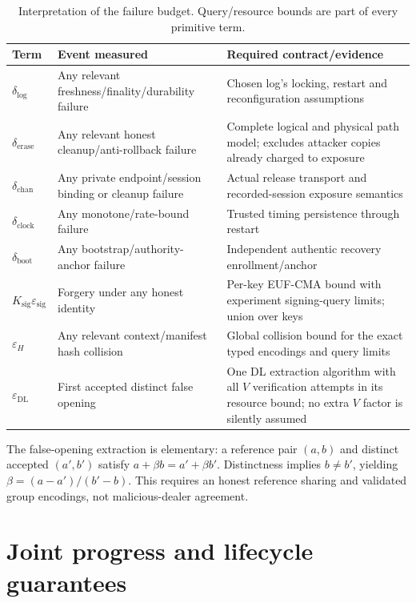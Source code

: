 \documentclass[pdflatex,sn-mathphys-num]{sn-jnl}
\theoremstyle{plain}
\theoremstyle{definition}
\begin{document}
\begin{table}[htbp]
\caption{Interpretation of the failure budget. Query/resource bounds are part of every primitive term.}\label{tab:budget}
\centering\footnotesize
\begin{tabularx}{\linewidth}{@{}p{.20\linewidth}YY@{}}\toprule
Term & Event measured & Required contract/evidence\\\midrule
$\delta_{\mathrm{log}}$ & Any relevant freshness/finality/durability failure & Chosen log's locking, restart and reconfiguration assumptions\\
$\delta_{\mathrm{erase}}$ & Any relevant honest cleanup/anti-rollback failure & Complete logical and physical path model; excludes attacker copies already charged to exposure\\
$\delta_{\mathrm{chan}}$ & Any private endpoint/session binding or cleanup failure & Actual release transport and recorded-session exposure semantics\\
$\delta_{\mathrm{clock}}$ & Any monotone/rate-bound failure & Trusted timing persistence through restart\\
$\delta_{\mathrm{boot}}$ & Any bootstrap/authority-anchor failure & Independent authentic recovery enrollment/anchor\\
$K_{\mathrm{sig}}\varepsilon_{\mathrm{sig}}$ & Forgery under any honest identity & Per-key EUF-CMA bound with experiment signing-query limits; union over keys\\
$\varepsilon_H$ & Any relevant context/manifest hash collision & Global collision bound for the exact typed encodings and query limits\\
$\varepsilon_{\mathrm{DL}}$ & First accepted distinct false opening & One DL extraction algorithm with all $V$ verification attempts in its resource bound; no extra $V$ factor is silently assumed\\\bottomrule
\end{tabularx}
\end{table}

The false-opening extraction is elementary: a reference pair $(a,b)$ and distinct accepted $(a',b')$ satisfy $a+\beta b=a'+\beta b'$. Distinctness implies $b\ne b'$, yielding $\beta=(a-a')/(b'-b)$. This requires an honest reference sharing and validated group encodings, not malicious-dealer agreement.

\section{Joint progress and lifecycle guarantees}\label{sec:lifecycle}
\end{document}
